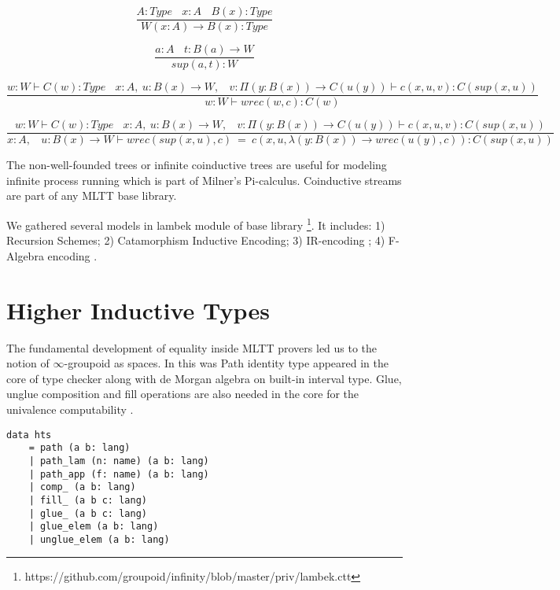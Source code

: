 \documentclass{article}
\begin{document}
\begin{equation}
\tag{$W$-formation}
\dfrac
{A:Type\ \ \ \ x:A\ \ \ \ B(x):Type}
{W (x:A) \rightarrow B(x) : Type}
\end{equation}

\begin{equation}
\tag{$W$-intro}
\dfrac
{a:A\ \ \ \ t: B(a) \rightarrow W}
{sup(a,t) : W}
\end{equation}

\begin{equation}
\tag{$W$-elimination}
\dfrac
{w: W \vdash C(w) : Type\ \ \ \ x:A,\ u:B(x) \rightarrow W,\ \ \ \ v:\Pi (y:B(x)) \rightarrow C(u(y)) \vdash c(x,u,v):C(sup(x,u))}
{w:W \vdash wrec(w,c):C(w)}
\end{equation}

\begin{equation}
\tag{$W$-computation}
\dfrac
{w: W \vdash C(w) : Type\ \ \ \ x:A,\ u:B(x) \rightarrow W,\ \ \ \ v:\Pi (y:B(x)) \rightarrow C(u(y)) \vdash c(x,u,v):C(sup(x,u))}
{x:A,\ \ \ \ u:B(x) \rightarrow W \vdash wrec(sup(x,u),c)\ =\ c(x,u,\lambda (y:B(x)) \rightarrow wrec(u(y),c)):C(sup(x,u))}
\end{equation}

The non-well-founded trees or infinite coinductive trees \cite{Jacobs97,Basold16}
are useful for modeling infinite process running which is
part of Milner's Pi-calculus. Coinductive streams are
part of any MLTT base library.

We gathered several models in lambek module of base library \footnote{https://github.com/groupoid/infinity/blob/master/priv/lambek.ctt}.
It includes:
1) Recursion Schemes;
2) Catamorphism Inductive Encoding;
3) IR-encoding \cite{Dagand13};
4) F-Algebra encoding  \cite{Hinze13}.

\section{Higher Inductive Types}

The fundamental development of equality inside MLTT
provers led us to the notion of $\infty$-groupoid \cite{Streicher95} as spaces.
In this was Path identity type appeared in the core
of type checker along with de Morgan algebra on
built-in interval type. Glue, unglue composition
and fill operations are also needed in the core
for the univalence computability \cite{Mortberg17}.

\begin{lstlisting}[mathescape=true]
data hts
    = path (a b: lang)
    | path_lam (n: name) (a b: lang)
    | path_app (f: name) (a b: lang)
    | comp_ (a b: lang)
    | fill_ (a b c: lang)
    | glue_ (a b c: lang)
    | glue_elem (a b: lang)
    | unglue_elem (a b: lang)
\end{lstlisting}
\end{document}
